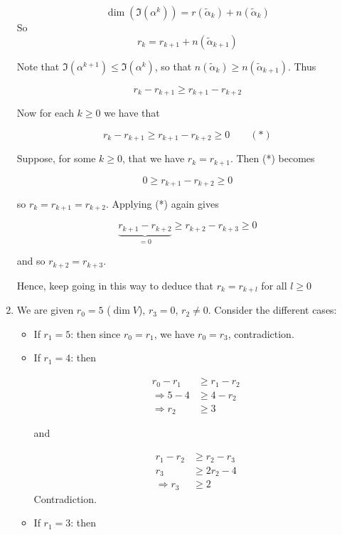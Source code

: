 \documentclass[a4paper]{article}
\begin{document}
\begin{enumerate}
\[ \dim (\Im(\alpha^{k})) = r(\widetilde{\alpha}_{k}) + n(\widetilde{\alpha}_{k}) \]
So
\[ r_{k} = r_{k+1} + n(\tilde{\alpha}_{k+1}) \]


Note that $ \Im (\alpha^{k+1}) \leq \Im ( \alpha^{k}) $, so that $ n(\tilde{\alpha}_{k}) \geq n(\tilde{\alpha}_{k+1}) $. Thus

\[ r_{k} - r_{k+1} \geq r_{k+1} - r_{k+2} \]



Now for each $ k \geq 0 $ we have that

\[ r_{k} - r_{k+1} \geq r_{k+1} - r_{k+2} \geq 0 \qquad (*) \]

Suppose, for some $ k \geq 0 $, that we have $ r_{k} = r_{k+1} $. Then (*) becomes

\[ 0 \geq r_{k+1} - r_{k+2} \geq 0 \]

so $ r_{k} = r_{k+1} = r_{k+2} $. Applying (*) again gives

\[ \underbrace{r_{k+1} - r_{k+2}}_{=0} \geq r_{k+2} - r_{k+3} \geq 0 \]

and so $ r_{k+2} = r_{k+3} $.

Hence, keep going in this way to deduce that $ r_{k} = r_{k+l}  $ for all $ l \geq 0 $

\item We are given $ r_{0} = 5 $ ($ \dim V $), $ r_{3} = 0 $, $ r_{2} \neq 0 $. Consider the different cases:

\begin{itemize}
	\item If $ r_{1} = 5 $: then since $ r_{0} = r_{1} $, we have $ r_{0} = r_{3} $, contradiction.
	\item If $ r_{1} = 4 $: then 
	
	\begin{align*}
	r_{0} - r_{1} & \geq r_{1} - r_{2}  \\
	\Rightarrow  5 - 4 & \geq 4 - r_{2} \\
	\Rightarrow r_{2} & \geq 3
	\end{align*}
	
	and 
	
	\begin{align*}
	r_{1} - r_{2} & \geq r_{2} - r_{3} \\
	r_{3} & \geq 2 r_{2} - 4 \\
	\Rightarrow r_{3} & \geq 2
	\end{align*}
	Contradiction.
	
	\item If $ r_{1} = 3 $: then
	

\end{itemize}
\end{enumerate}
\end{document}
